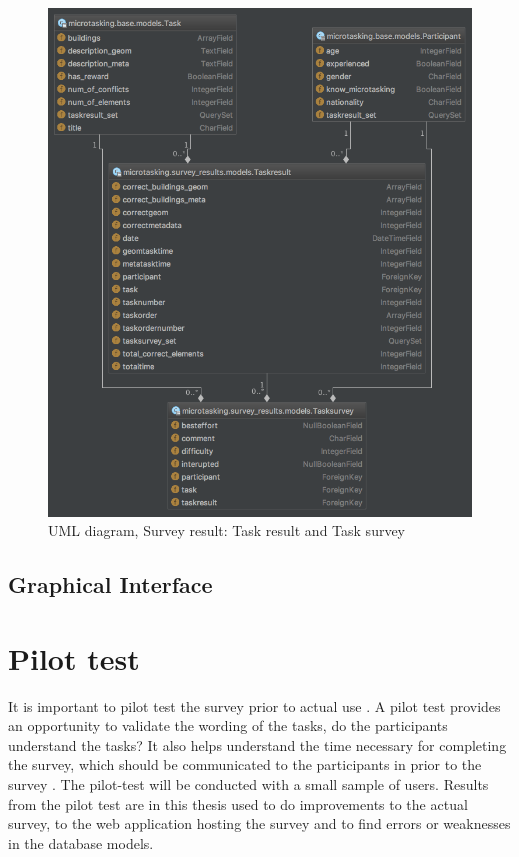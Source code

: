 \begin{figure}[H]
	\centering
	\includegraphics[width=0.8\linewidth]{fig/uml_diagram_taskresult}
	\caption[Survey result, UML diagram]{UML diagram, Survey result: Task result and Task survey}
	\label{fig:umldiagramtaskresult}
\end{figure}



\subsection{Graphical Interface}

\section{Pilot test}
It is important to pilot test the survey prior to actual use \citep{Ben2009}. A pilot test provides an opportunity to validate the wording of the tasks, do the participants understand the tasks? It also helps understand the time necessary for completing the survey, which should be communicated to the participants in prior to the survey \citep{Schade2015}. The pilot-test will be conducted with a small sample of users. Results from the pilot test are in this thesis used to do improvements to the actual survey, to the web application hosting the survey and to find errors or weaknesses in the database models.

